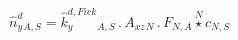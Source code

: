 \documentclass[border=2pt]{standalone}
\begin{document}
${{\hat{n}^{d}_y}}{_{A, S}}={{\hat{k}^{d,Fick}_y}}{_{A, S}} \, . \, {{A_{xz}}}{_{N}} \, . \, {{F}}{_{N, A}} \stackrel{N}{\star} {c}{_{N, S}}$
\end{document}
